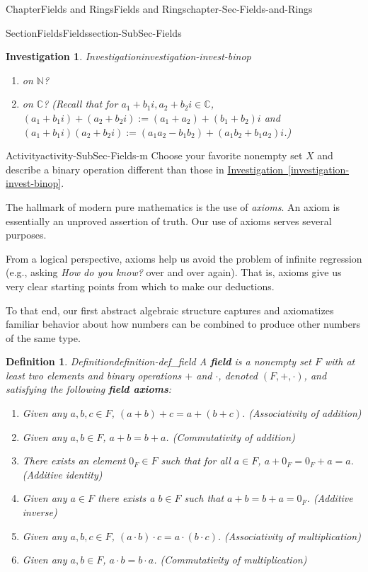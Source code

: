 \documentclass[oneside,10pt,]{book}
\newcommand{\xreffont}{\relax}
\newcommand{\terminology}[1]{\textbf{#1}}
\numberwithin{equation}{section}
\def\C{{\mathbb C}}
\def\N{{\mathbb N}}
\newtheorem{definition}[theorem]{Definition}
\newtheorem{investigation}[theorem]{Investigation}
\begin{document}
\begin{chapterptx}{Chapter}{Fields and Rings}{}{Fields and Rings}{}{}{chapter-Sec-Fields-and-Rings}
\begin{sectionptx}{Section}{Fields}{}{Fields}{}{}{section-SubSec-Fields}
\begin{investigation}{Investigation}{}{investigation-invest-binop}
\begin{enumerate}
\item{}on \(\N\)?%
\item{}on \(\C\)? (Recall that for \(a_1 + b_1 i, a_2 + b_2 i \in \C\), \((a_1 + b_1 i) + (a_2 + b_2 i) := (a_1 + a_2) + (b_1 + b_2)i\) and  \((a_1 + b_1 i)(a_2 + b_2 i) := (a_1 a_2 - b_1 b_2) + (a_1 b_2 + b_1 a_2) i\).)%
\end{enumerate}
%
\end{investigation}%
\begin{activity}{Activity}{}{activity-SubSec-Fields-m}%
Choose your favorite nonempty set \(X\) and describe a binary operation different than those in \hyperref[investigation-invest-binop]{Investigation~{\xreffont\ref{investigation-invest-binop}}}.%
\end{activity}%
The hallmark of modern pure mathematics is the use of \emph{axioms}. An axiom is essentially an unproved assertion of truth. Our use of axioms serves several purposes.%
\par
From a logical perspective, axioms help us avoid the problem of infinite regression (e.g., asking \emph{How do you know?} over and over again). That is, axioms give us very clear starting points from which to make our deductions.%
\par
To that end, our first abstract algebraic structure captures and axiomatizes familiar behavior about how numbers can be combined to produce other numbers of the same type.%
\begin{definition}{Definition}{}{definition-def_field}%
%
A \terminology{field} is a nonempty set \(F\) with at least two elements and binary operations \(+\) and \(\cdot\), denoted \((F,+,\cdot)\), and satisfying the following \terminology{field axioms}:%
\begin{enumerate}
\item{}Given any \(a,b,c\in F\), \((a+b)+c = a+(b+c)\). (Associativity of addition)%
\item{}Given any \(a,b\in F\), \(a+b= b+a\). (Commutativity of addition)%
\item{}There exists an element \(0_F\in F\) such that for all \(a\in F\), \(a+0_F = 0_F + a = a\). (Additive identity)%
\item{}Given any \(a\in F\) there exists a \(b\in F\) such that \(a+b = b + a =0_F\). (Additive inverse)%
\item{}Given any \(a,b,c\in F\), \((a\cdot b)\cdot c = a\cdot (b\cdot c)\). (Associativity of multiplication)%
\item{}Given any \(a,b\in F\), \(a\cdot b = b\cdot a\). (Commutativity of multiplication)%

\end{enumerate}
\end{definition}
\end{sectionptx}
\end{chapterptx}
\end{document}
